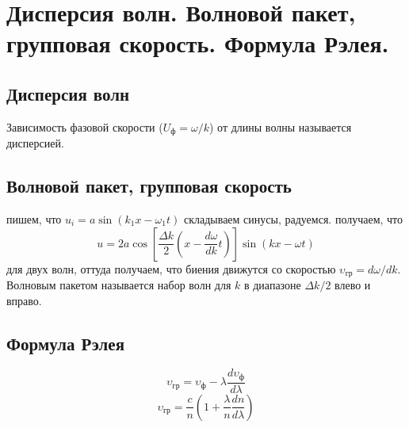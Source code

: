 \section{Дисперсия волн. Волновой пакет, групповая скорость. Формула Рэлея.}
\subsection{Дисперсия волн}
Зависимость фазовой скорости ($U_ф = \omega/k$) от длины волны называется дисперсией.
\subsection{Волновой пакет, групповая скорость}
пишем, что $u_i = a \sin (k_1 x - \omega_1 t)$ складываем синусы, радуемся. получаем, что
$$u = 2a \cos \left[ \frac{\Delta k}{2} \left( x - \frac{d \omega }{d k } t \right) \right] \sin (kx - \omega t)$$
для двух волн, оттуда получаем, что биения движутся со скоростью $\upsilon_{гр} = d\omega / dk$.\\
Волновым пакетом называется набор волн для $k$ в диапазоне $\Delta k / 2$ влево и вправо.
\subsection{Формула Рэлея}
$$\upsilon_{гр}  = \upsilon_ф - \lambda \frac{d \upsilon_{ф}}{d\lambda}$$
$$\upsilon_{гр}  = \frac{c}{n} \left( 1 + \frac{\lambda}{n} \frac{d n}{d \lambda} \right)$$